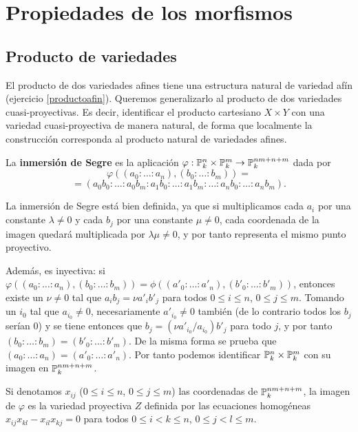 \documentclass[ACGA.tex]{subfiles}
\begin{document}
\chapter{Propiedades de los morfismos}

\section{Producto de variedades}

El producto de dos variedades afines tiene una estructura natural de variedad afín (ejercicio \ref{productoafin}). Queremos generalizarlo al producto de dos variedades cuasi-proyectivas. Es decir, identificar el producto cartesiano $X\times Y$ con una variedad cuasi-proyectiva de manera natural, de forma que localmente la construcción corresponda al producto natural de variedades afines.

\begin{defi} La {\bf inmersión de Segre} es la aplicación $\varphi:\mathbb{P}^n_k\times\mathbb{P}^m_k\to\mathbb{P}^{nm+n+m}_k$ dada por
 $$
\varphi((a_0:\ldots:a_n),(b_0:\ldots:b_m))=
$$
$$
=(a_0b_0:\ldots:a_0b_m:a_1b_0:\ldots:a_1b_m:\ldots:a_nb_0:\ldots:a_nb_m).
$$
\end{defi}

La inmersión de Segre está bien definida, ya que si multiplicamos cada $a_i$ por una constante $\lambda\neq 0$ y cada $b_j$ por una constante $\mu\neq 0$, cada coordenada de la imagen quedará multiplicada por $\lambda\mu\neq 0$, y por tanto representa el mismo punto proyectivo.

Además, es inyectiva: si $\varphi((a_0:\ldots:a_n),(b_0:\ldots:b_m))=\phi((a'_0:\ldots:a'_n),(b'_0:\ldots:b'_m))$, entonces existe un $\nu\neq 0$ tal que $a_ib_j=\nu a'_ib'_j$ para todos $0\leq i\leq n$, $0\leq j\leq m$. Tomando un $i_0$ tal que $a_{i_0}\neq 0$, necesariamente $a'_{i_0}\neq 0$ también (de lo contrario todos los $b_j$ serían $0$) y se tiene entonces que $b_j=(\nu a'_{i_0}/a_{i_0})b'_j$ para todo $j$, y por tanto $(b_0:\ldots:b_m)=(b'_0:\ldots:b'_m)$. De la misma forma se prueba que $(a_0:\ldots:a_n)=(a'_0:\ldots:a'_n)$. Por tanto podemos identificar $\mathbb{P}^n_k\times\mathbb{P}^m_k$ con su imagen en $\mathbb{P}^{nm+n+m}_k$.

\begin{prop}
 Si denotamos $x_{ij}$ ($0\leq i\leq n$, $0\leq j\leq m$) las coordenadas de $\mathbb{P}^{nm+n+m}_k$, la imagen de $\varphi$ es la variedad proyectiva $Z$ definida por las ecuaciones homogéneas $x_{ij}x_{kl}-x_{il}x_{kj}=0$ para todos $0\leq i<k\leq n$, $0\leq j<l\leq m$. 
\end{prop}
\end{document}
